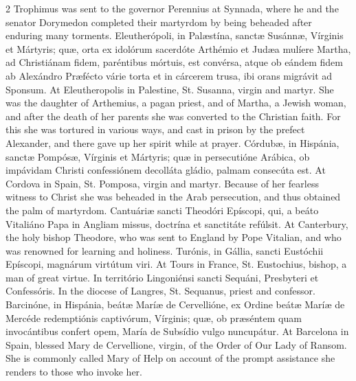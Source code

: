 \begin{paracol}{2}
 Trophimus was sent to the governor Perennius at Synnada, where he and the 
 senator Dorymedon completed their martyrdom by being beheaded after enduring 
 many torments.
\switchcolumn*
{}
Eleutherópoli, in 
 Palæstína, sanctæ Susánnæ, Vírginis et Mártyris; quæ, orta ex idolórum 
 sacerdóte Arthémio et Judæa mulíere Martha, ad Christiánam fidem, paréntibus 
 mórtuis, est convérsa, atque ob eándem fidem ab Alexándro Præfécto várie 
 torta et in cárcerem trusa, ibi orans migrávit ad Sponsum.
\switchcolumn
{}
At Eleutheropolis in Palestine, St. 
 Susanna, virgin and martyr. She was the daughter of Arthemius, a pagan 
 priest, and of Martha, a Jewish woman, and after the death of her parents 
 she was converted to the Christian faith. For this she was tortured in 
 various ways, and cast in prison by the prefect Alexander, and there gave up 
 her spirit while at prayer.
\switchcolumn*
{}
Córdubæ, in Hispánia, 
 sanctæ Pompósæ, Vírginis et Mártyris; quæ in persecutióne Arábica, ob impávidam Christi confessiónem decolláta gládio, palmam consecúta est.
\switchcolumn
{}
At Cordova in Spain, St. Pomposa, 
 virgin and martyr. Because of her fearless witness to Christ she was 
 beheaded in the Arab persecution, and thus obtained the palm of martyrdom.
\switchcolumn*
{}
Cantuáriæ sancti 
 Theodóri Epíscopi, qui, a beáto Vitaliáno Papa in Angliam missus, doctrína 
 et sanctitáte refúlsit.
\switchcolumn
{}
At Canterbury, the holy bishop 
 Theodore, who was sent to England by Pope Vitalian, and who was renowned for 
 learning and holiness.
\switchcolumn*
{}
Turónis, in Gállia, 
 sancti Eustóchii Epíscopi, magnárum virtútum viri.
\switchcolumn
{}
At Tours in France, St. Eustochius, 
 bishop, a man of great virtue.
\switchcolumn*
{}
In território 
 Lingoniénsi sancti Sequáni, Presbyteri et Confessóris.
\switchcolumn
{}
In the diocese of Langres, St. 
 Sequanus, priest and confessor.
\switchcolumn*
{}
Barcinóne, in Hispánia, 
 beátæ Maríæ de Cervellióne, ex Ordine beátæ Maríæ de Mercéde redemptiónis 
 captivórum, Vírginis; quæ, ob præséntem quam invocántibus confert opem, 
 María de Subsídio vulgo nuncupátur.
\switchcolumn
{}
At Barcelona in Spain, blessed Mary 
 de Cervellione, virgin, of the Order of Our Lady of Ransom. She is 
 commonly called Mary of Help on account of the prompt assistance she renders 
 to those who invoke her.

\end{paracol}
